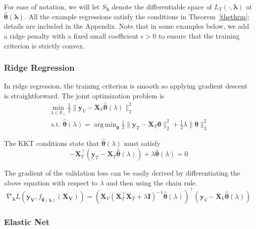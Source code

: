 \documentclass{statsoc}
\DeclareMathOperator*{\argmin}{arg\,min}
\begin{document}
For ease of notation, we will let $S_{\boldsymbol{\lambda}}$ denote the differentiable space of $L_T(\cdot, \boldsymbol{\lambda})$ at $\hat{\boldsymbol{\theta}}(\boldsymbol{\lambda})$. All the example regressions satisfy the conditions in Theorem~\ref{thethrm}; details are included in the Appendix. Note that in some examples below, we add a ridge penalty with a fixed small coefficient $\epsilon > 0$ to ensure that the training criterion is strictly convex.

\subsubsection{Ridge Regression}

In ridge regression, the training criterion is smooth so applying gradient descent is straightforward. The joint optimization problem is
\begin{equation}
\begin{array}{c}
\min_{\lambda\in \mathbb{R}_{+}} \frac{1}{2} \| \boldsymbol{y}_V - \boldsymbol{X}_V \hat{\boldsymbol{\theta}} (\lambda) \|_2 ^2 \\
\text{  s.t.  } \hat{\boldsymbol{\theta}} (\lambda) = \argmin_{\boldsymbol{\theta}} \frac{1}{2} \| \boldsymbol{y}_T - \boldsymbol{X}_T \boldsymbol{\theta} \|_2 ^2 + \frac{1}{2} \lambda \| \boldsymbol{\theta} \|_2^2
\end{array}
\end{equation}

The KKT conditions state that $\hat{\boldsymbol{\theta}}(\lambda)$ must satisfy
\begin{equation}
-\boldsymbol{X}_T^\top (\boldsymbol{y}_T - \boldsymbol{X}_T \hat{\boldsymbol{\theta}} (\lambda)) + \lambda \hat{\boldsymbol{\theta}} (\lambda) = 0
\end{equation}

The gradient of the validation loss can be easily derived by differentiating the above equation with respect to $\lambda$ and then using the chain rule.
\begin{equation}
\nabla_{\boldsymbol \lambda} L(\boldsymbol{y_V}, f_{\hat {\boldsymbol \theta}(\boldsymbol \lambda)}(\boldsymbol{X_V}))
= (\boldsymbol{X}_V(\boldsymbol{X}_T^\top \boldsymbol{X}_T + \lambda \boldsymbol{I})^{-1}
\hat{\boldsymbol{\theta}}(\lambda))^{\top}
(\boldsymbol{y}_V - \boldsymbol{X}_V \hat{\boldsymbol{\theta}}(\lambda))
\end{equation}

\subsubsection{Elastic Net}\label{sec:enet}
\end{document}
